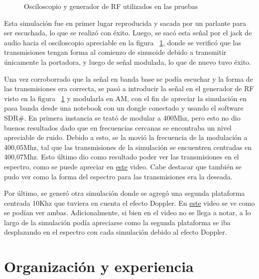 \documentclass[a4paper,10pt]{article}
\begin{document}
\begin{figure}[H]
\centering
{}
\caption{Osciloscopio y generador de RF utilizados en las pruebas}
\label{Test}
\end{figure}

Esta simulación fue en primer lugar reproducida y sacada por un parlante para ser escuchada, lo que se realizó con éxito. Luego, se sacó esta señal por el jack de audio hacia el osciloscopio apreciable en la figura ~\ref{Test}, donde se verificó que las transmisiones tengan forma al comienzo de sinusoide debido a transmitir únicamente la portadora, y luego de señal modulada, lo que de nuevo tuvo éxito.
\par
Una vez corroborrado que la señal en banda base se podía escuchar y la forma de las transmisiones era correcta, se pasó a introducir la señal en el generador de RF visto en la figura ~\ref{Test} y modularla en AM, con el fin de apreciar la simulación en pasa banda desde una notebook con un dongle conectado y usando el software SDR\#. En primera instancia se trató de modular a 400Mhz, pero esto no dio buenos resultados dado que en frecuencias cercanas se encontraba un nivel apreciable de ruido. Debido a esto, se la movió la frecuencia de la modulación a  400,05Mhz, tal que las transmisiones de la simulación se encuentren centradas en 400,07Mhz. Esto último dio como resultado poder ver las transmisiones en el espectro, como se puede apreciar en \textcolor{blue}{\href {https://drive.google.com/file/d/1FieeQKkBJIfpKAu_4E4Ik1SV4s9q1Qw6/view?usp=sharing}{este}} video. Cabe destacar que también se pudo ver como la forma del espectro para las transmisiones era la deseada.
\par
Por último, se generó otra simulación donde se agregó una segunda plataforma centrada 10Khz que tuviera en cuenta el efecto Doppler. En  \textcolor{blue}{\href {https://drive.google.com/file/d/1FfI8xw6hzwwgcrzLQBHW1-g3nXa6ZuWW/view?usp=sharing}{este}} video se ve como se podían ver ambas. Adicionalmente, si bien en el video no se llega a notar, a lo largo de la simulación podía apreciarse como la segunda plataforma se iba desplazando en el espectro con cada simulación debido al efecto Doppler.


\section{Organización y experiencia}
\end{document}
